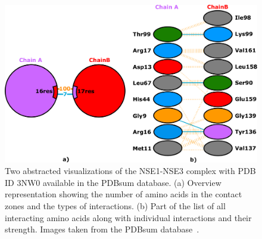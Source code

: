 \documentclass{bmcart}
\begin{document}
\begin{backmatter}
\begin{figure}[h!]
  \centering	
  \includegraphics[width=0.9\columnwidth]{images/figure2.pdf}
  \caption{
    Two abstracted visualizations of the NSE1-NSE3 complex with PDB ID 3NW0 available in the PDBsum database. (a) Overview representation showing the number of amino acids in the contact zones and the types of interactions. (b) Part of the list of all interacting amino acids along with individual interactions and their strength. Images taken from the PDBsum database~\cite{pdbsum}.}
    \label{fig:pdbsum}
\end{figure}


\end{backmatter}
\end{document}
